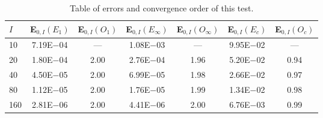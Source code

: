 \begin{table}[H]
\caption{Table of errors and convergence order of this test.}
\setlength{\tabcolsep}{5pt}
\centering
\begin{tabular}{@{}l c c c c c c@{}}
\toprule
$I$ & 
E$_{0,I}(E_{1})$ & 
E$_{0,I}(O_{1})$ &
E$_{0,I}(E_{\infty})$ & 
E$_{0,I}(O_{\infty})$ & 
E$_{0,I}(E_{c})$ & 
E$_{0,I}(O_{c})$\\
\midrule
10  & 7.19E$-$04 & ---  & 1.08E$-$03 & ---  & 9.95E$-$02 & --- \\
20  & 1.80E$-$04 & 2.00 & 2.76E$-$04 & 1.96 & 5.20E$-$02 & 0.94\\
40  & 4.50E$-$05 & 2.00 & 6.99E$-$05 & 1.98 & 2.66E$-$02 & 0.97\\
80  & 1.12E$-$05 & 2.00 & 1.76E$-$05 & 1.99 & 1.34E$-$02 & 0.98\\
160 & 2.81E$-$06 & 2.00 & 4.41E$-$06 & 2.00 & 6.76E$-$03 & 0.99\\
\bottomrule
\end{tabular}
\end{table}

